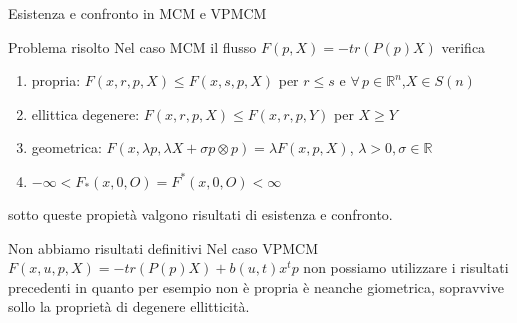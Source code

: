 \begin{frame}{Esistenza e confronto in MCM e VPMCM}
  \begin{block}{Problema risolto}
    Nel caso MCM il flusso $F(p,X)=-tr(P(p)X)$ verifica
    \begin{enumerate}
    \item \alert{propria}: $F(x,r,p,X)\leq F(x,s,p,X)$ per $r\leq
      s$ e $\forall\,p\in\mathbb{R}^n$,$X\in S(n)$
    \item \alert{ellittica degenere}: $F(x,r,p,X)\leq
      F(x,r,p,Y)$ per $X\geq Y$
    \item \alert{geometrica}: $F(x,\lambda p,\lambda X+\sigma
      p\otimes p)=\lambda F(x,p,X)$, $\lambda >0,\sigma\in\mathbb{R}$
      \item $-\infty<F_*(x,0,O)=F^*(x,0,O)<\infty$
    \end{enumerate}
    sotto queste propietà valgono risultati di esistenza e confronto.
  \end{block}
  \begin{block}{Non abbiamo risultati definitivi}
    Nel caso VPMCM $F(x,u,p,X)=-tr(P(p)X)+b(u,t)x^tp$ non possiamo
    utilizzare i risultati precedenti in quanto per esempio non è
    \alert{propria} è neanche \alert{giometrica}, sopravvive sollo la
    proprietà di \alert{degenere ellitticità}.
  \end{block}
\end{frame}
